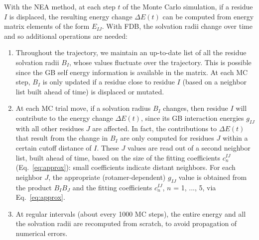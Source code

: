 \documentclass[a4paper,12pt]{article}
\begin{document}
With the NEA method, at each step $t$ of the Monte Carlo simulation, if a residue $I$ is displaced, the resulting energy change
$\Delta E(t)$ can be computed from energy matrix elements of the form $E_{IJ}$. With FDB, the solvation radii change over time
and so additional operations are needed:
\begin{enumerate}
\item Throughout the trajectory, we maintain an up-to-date list of all the residue solvation radii $B_I$, whose values fluctuate
over the trajectory. This is possible since the GB self energy information is available in the matrix. At each MC step, $B_I$ is
only updated if a residue close to residue $I$ (based on a neighbor list built ahead of time) is displaced or mutated.

\item At each MC trial move, if a solvation radius $B_I$ changes, then residue $I$ will contribute to the energy change
$\Delta E(t)$, since its GB interaction energies $g_{IJ}$ with all other residues $J$ are affected. In fact, the contributions
to $\Delta E(t)$ that result from the change in $B_I$ are only computed for residues $J$ within a certain cutoff distance of
$I$. These $J$ values are read out of a second neighbor list, built ahead of time, based on the size of the fitting coefficients
$c_n^{IJ}$ (Eq.\ \ref{eq:approx}): small coefficients indicate distant neighbors. For each neighbor $J$, the appropriate
(rotamer-dependent)  $g_{IJ}$ value is obtained from the product $B_I B_J$ and the fitting coefficients $c_n^{IJ}$, $n$ =
1, ..., 5, via Eq.\ \ref{eq:approx}. 
\item At regular intervals (about every 1000 MC steps), the entire energy and all the solvation radii are recomputed from scratch,
to avoid propagation of numerical errors. 
\end{enumerate}
\end{document}
